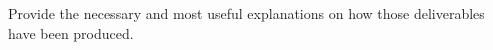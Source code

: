 {\color{gray}
Provide the necessary and most useful explanations on how those deliverables have been produced.
}
